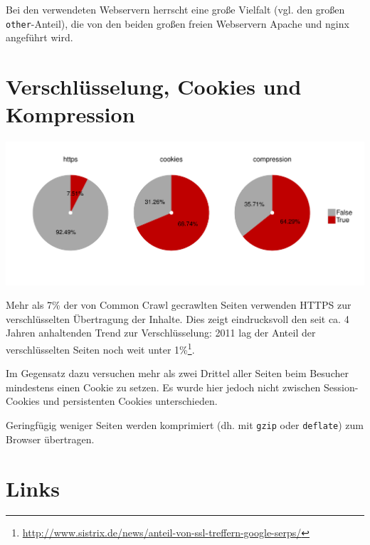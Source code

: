 \documentclass[a4paper,12pt,titlepage=false]{scrreprt}
\begin{document}
\noindent
Bei den verwendeten Webservern herrscht eine große Vielfalt (vgl. den großen \texttt{other}-Anteil), die von den beiden großen freien Webservern Apache und nginx angeführt wird.

\section{Verschlüsselung, Cookies und Kompression}

\begin{center}
    \includegraphics[trim=0 2cm 0 .5cm, clip=true, width=.9\textwidth]{plots/plot_boolean_pie}
\end{center}

\noindent
Mehr als 7\% der von Common Crawl gecrawlten Seiten verwenden HTTPS zur verschlüsselten Übertragung der Inhalte. Dies zeigt eindrucksvoll den seit ca. 4 Jahren anhaltenden Trend zur Verschlüsselung: 2011 lag der Anteil der verschlüsselten Seiten noch weit unter 1\%\footnote{%
\url{http://www.sistrix.de/news/anteil-von-ssl-treffern-google-serps/}}.

Im Gegensatz dazu versuchen mehr als zwei Drittel aller Seiten beim Besucher mindestens einen Cookie zu setzen. Es wurde hier jedoch nicht zwischen Session-Cookies und persistenten Cookies unterschieden.

Geringfügig weniger Seiten werden komprimiert (dh. mit \texttt{gzip} oder \texttt{deflate}) zum Browser übertragen.

\section{Links}
\end{document}
